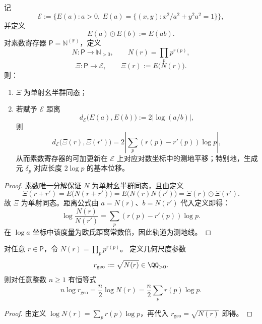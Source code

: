 \begin{theorem}[单位圆信息的面积守恒投影族与素数同态实现]\label{thm:group-jg-ellipse-prime-homomorphism}
记
\[
\mathcal E:=\{E(a):a>0,\ E(a)=\{(x,y):x^2/a^2+y^2a^2=1\}\},
\]
并定义
\[
E(a)\odot E(b):=E(ab).
\]
对素数寄存器 \(\mathsf{P}=\mathbb N^{(\mathbb P)}\)，定义
\[
N:\mathsf P\to\mathbb N_{>0},
\qquad
N(r)=\prod_{p}p^{r(p)},
\]
\[
\Xi:\mathsf P\to\mathcal E,\qquad
\Xi(r):=E\bigl(N(r)\bigr).
\]
则：
\begin{enumerate}
  \item \(\Xi\) 为单射幺半群同态；
  \item 若赋予 \(\mathcal E\) 距离
  \[
  d_{\mathcal E}\!\bigl(E(a),E(b)\bigr):=2|\log(a/b)|,
  \]
  则
  \[
  d_{\mathcal E}\!\bigl(\Xi(r),\Xi(r')\bigr)
  =2\left|\sum_{p}(r(p)-r'(p))\log p\right|,
  \]
  从而素数寄存器的可加更新在 \(\mathcal E\) 上对应对数坐标中的测地平移；特别地，生成元 \(\delta_p\) 对应长度 \(2\log p\) 的基本位移。
\end{enumerate}
\end{theorem}
\begin{proof}
素数唯一分解保证 \(N\) 为单射幺半群同态，且由定义
\[
\Xi(r+r')=E\!\bigl(N(r+r')\bigr)=E\!\bigl(N(r)N(r')\bigr)=\Xi(r)\odot\Xi(r').
\]
故 \(\Xi\) 为单射同态。距离公式由 \(a=N(r)\)、\(b=N(r')\) 代入定义即得：
\[
\log\!\frac{N(r)}{N(r')}
=\sum_p (r(p)-r'(p))\log p.
\]
在 \(\log a\) 坐标中该度量为欧氏距离常数倍，因此轨道为测地线。
\end{proof}



\begin{proposition}\label{prop:group-jg-godel-norm-log-scale-drift}
对任意 \(r\in\mathsf P\)，令 \(N(r)=\prod_p p^{r(p)}\)。
定义几何尺度参数
\[
r_{\mathrm{geo}}:=\sqrt{N(r)}\in\QQ_{>0}.
\]
则对任意整数 \(n\ge 1\) 有恒等式
\[
n\log r_{\mathrm{geo}}
=\frac n2\log N(r)
=\frac n2\sum_{p} r(p)\log p.
\]
\end{proposition}
\begin{proof}
由定义 \(\log N(r)=\sum_p r(p)\log p\)，再代入 \(r_{\mathrm{geo}}=\sqrt{N(r)}\) 即得。
\end{proof}

